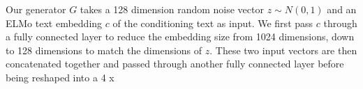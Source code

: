 Our generator $G$ takes a 128 dimension random noise vector $z \sim N(0, 1)$ and an ELMo text embedding $c$ of the conditioning text as input. We first pass $c$ through a fully connected layer to reduce the embedding size from 1024 dimensions, down to 128 dimensions to match the dimensions of $z$. These two input vectors are then concatenated together and passed through another fully connected layer before being reshaped into a 4 x 